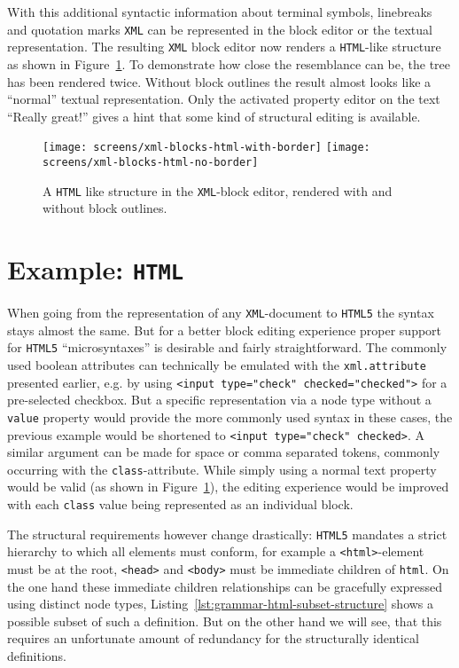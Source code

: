 \documentclass[sigconf,natbib=false]{acmart}
\newcommand{\enquote}[1]{``#1''}
\begin{document}
With this additional syntactic information about terminal symbols, linebreaks and quotation marks \texttt{XML} can be represented in the block editor or the textual representation. The resulting \texttt{XML} block editor now renders a \texttt{HTML}-like structure as shown in Figure~\ref{fig:screen-editor-xml-no-border}. To demonstrate how close the resemblance can be, the tree has been rendered twice. Without block outlines the result almost looks like a \enquote{normal} textual representation. Only the activated property editor on the text \enquote{Really great!} gives a hint that some kind of structural editing is available.

\begin{figure}
  \texttt{[image: screens/xml-blocks-html-with-border]}
  \texttt{[image: screens/xml-blocks-html-no-border]}
  \caption{A \texttt{HTML} like structure in the \texttt{XML}-block editor, rendered with and without block outlines.}
  \label{fig:screen-editor-xml-no-border}
\end{figure}

\section{Example: \texttt{HTML}}

When going from the representation of any \texttt{XML}-document to \texttt{HTML5} the syntax stays almost the same. But for a better block editing experience proper support for \texttt{HTML5} \enquote{microsyntaxes} is desirable and fairly straightforward. The commonly used boolean attributes can technically be emulated with the \texttt{xml.attribute} presented earlier, e.g. by using \texttt{<input type="check" checked="checked">} for a pre-selected checkbox. But a specific representation via a node type without a \texttt{value} property would provide the more commonly used syntax in these cases, the previous example would be shortened to \texttt{<input type="check" checked>}. A similar argument can be made for space or comma separated tokens, commonly occurring with the \texttt{class}-attribute. While simply using a normal text property would be valid (as shown in Figure~\ref{fig:screen-editor-xml-no-border}), the editing experience would be improved with each \texttt{class} value being represented as an individual block.

The structural requirements however change drastically: \texttt{HTML5} mandates a strict hierarchy to which all elements must conform, for example a \texttt{<html>}-element must be at the root, \texttt{<head>} and \texttt{<body>} must be immediate children of \texttt{html}. On the one hand these immediate children relationships can be gracefully expressed using distinct node types, Listing~\ref{lst:grammar-html-subset-structure} shows a possible subset of such a definition. But on the other hand we will see, that this requires an unfortunate amount of redundancy for the structurally identical definitions.
\end{document}
